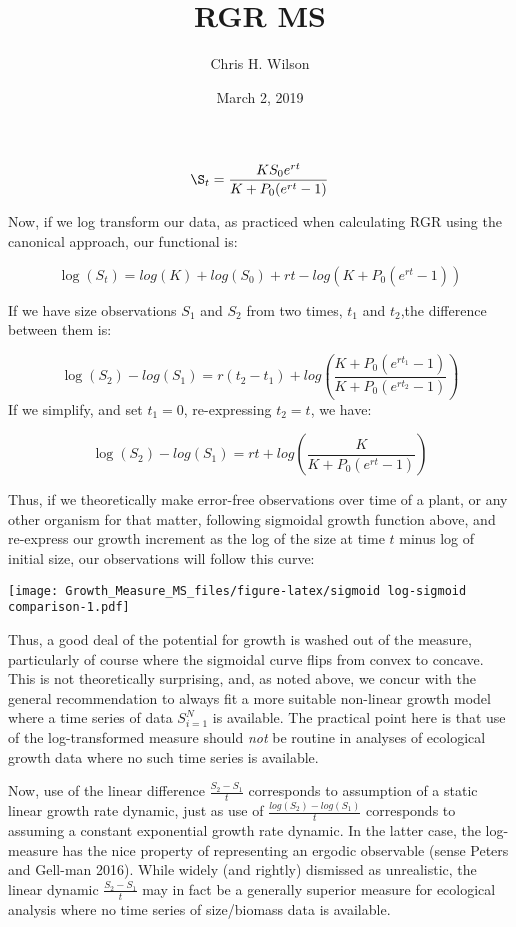 \documentclass[]{article}
\title{RGR MS}
\author{Chris H. Wilson}
\date{March 2, 2019}
\begin{document}
\maketitle

\[\S_t = \frac{KS_0e^{rt}}{K+P_0(e^{rt}-1)}\]

Now, if we log transform our data, as practiced when calculating RGR
using the canonical approach, our functional is:

\[\log(S_t) = log(K) + log(S_0) + rt - log(K + P_0(e^{rt}-1))\]

If we have size observations \(S_1\) and \(S_2\) from two times, \(t_1\)
and \(t_2\),the difference between them is:

\[\log(S_2) - log(S_1) = r(t_2 - t_1) + log(\frac{K + P_0(e^{rt_1}-1)}{K + P_0(e^{rt_2}-1)})\]
If we simplify, and set \(t_1=0\), re-expressing \(t_2=t\), we have:

\[\log(S_2) - log(S_1) = rt + log(\frac{K}{K + P_0(e^{rt}-1)})\]

Thus, if we theoretically make error-free observations over time of a
plant, or any other organism for that matter, following sigmoidal growth
function above, and re-express our growth increment as the log of the
size at time \(t\) minus log of initial size, our observations will
follow this curve:

\texttt{[image: Growth\_Measure\_MS\_files/figure-latex/sigmoid log-sigmoid comparison-1.pdf]}

Thus, a good deal of the potential for growth is washed out of the
measure, particularly of course where the sigmoidal curve flips from
convex to concave. This is not theoretically surprising, and, as noted
above, we concur with the general recommendation to always fit a more
suitable non-linear growth model where a time series of data
\({S}^N_{i=1}\) is available. The practical point here is that use of
the log-transformed measure should \emph{not} be routine in analyses of
ecological growth data where no such time series is available.

Now, use of the linear difference \(\frac{S_2 - S_1}{t}\) corresponds to
assumption of a static linear growth rate dynamic, just as use of
\(\frac{log(S_2) - log(S_1)}{t}\) corresponds to assuming a constant
exponential growth rate dynamic. In the latter case, the log-measure has
the nice property of representing an ergodic observable (sense Peters
and Gell-man 2016). While widely (and rightly) dismissed as unrealistic,
the linear dynamic \(\frac{S_2 - S_1}{t}\) may in fact be a generally
superior measure for ecological analysis where no time series of
size/biomass data is available.
\end{document}
